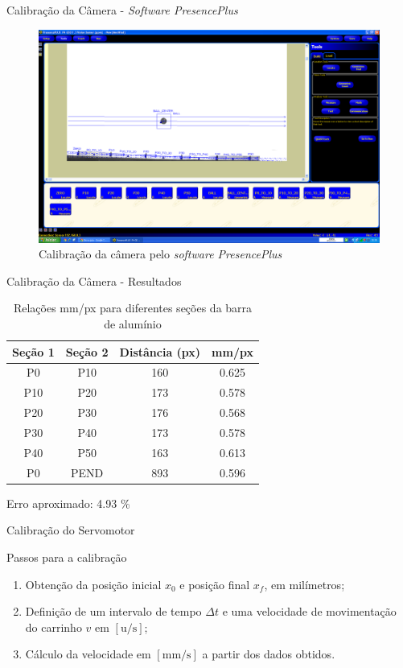 \documentclass[10pt]{beamer}
\begin{document}
\begin{frame}[fragile]{Calibração da Câmera - \textit{Software PresencePlus}}
\begin{figure}[!ht]
\centering
\includegraphics[width=.9\linewidth]{figures/resultados/camera/programa}
\caption{Calibração da câmera pelo \textit{software PresencePlus} \label{calibcamera}}
\end{figure}
\end{frame}

\begin{frame}[fragile]{Calibração da Câmera - Resultados}
\begin{table}[!ht]
\centering
\caption{Relações mm/px para diferentes seções da barra de alumínio \label{relacoesmmpx}}
	\begin{tabular}{|c|c|c|c|}
	\hline
		Seção 1 & Seção 2 & Distância (px) & mm/px\\ \hline
		P0 & P10 & 160 & 0.625\\ \hline
		P10 & P20 & 173 & 0.578\\ \hline
		P20 & P30 & 176 & 0.568\\ \hline
		P30 & P40 & 173 & 0.578\\ \hline
		P40 & P50 & 163 & 0.613\\ \hline
		P0 & PEND & 893 & 0.596\\ \hline
	\end{tabular}
\end{table}
Erro aproximado: 4.93 \%
\end{frame}

\begin{frame}[fragile]{Calibração do Servomotor}
\begin{block}{Passos para a calibração}
\begin{enumerate}
	\item Obtenção da posição inicial $x_0$ e posição final $x_f$, em milímetros;
	\item Definição de um intervalo de tempo $\Delta t$ e uma velocidade de movimentação do carrinho $v$ em $[\mathrm{u}/\mathrm{s}]$;
	\item Cálculo da velocidade em $[\mathrm{mm}/\mathrm{s}]$ a partir dos dados obtidos.
\end{enumerate}
\end{block}
\end{frame}
\end{document}
